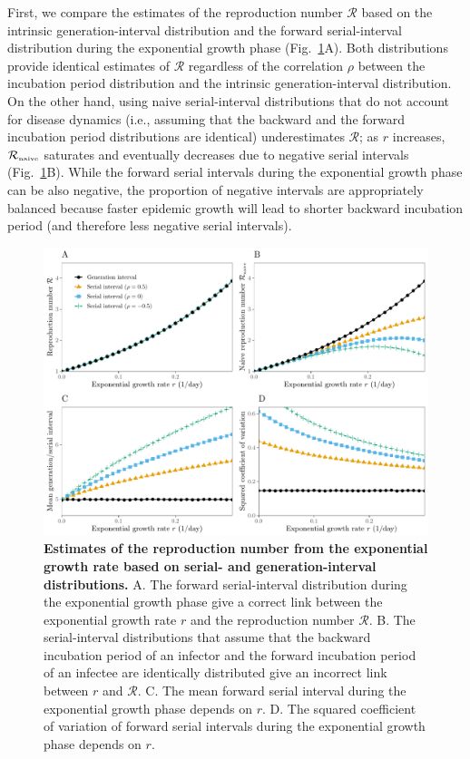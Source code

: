 \documentclass[12pt]{article}
\newcommand{\fref}[1]{Fig.~\ref{fig:#1}}
\begin{document}
First, we compare the estimates of the reproduction number $\mathcal R$ based on the intrinsic generation-interval distribution and the forward serial-interval distribution during the exponential growth phase (\fref{rR}A).
Both distributions provide identical estimates of $\mathcal R$ regardless of the correlation $\rho$ between the incubation period distribution and the intrinsic generation-interval distribution.
On the other hand, using naive serial-interval distributions that do not account for disease dynamics (i.e., assuming that the backward and the forward incubation period distributions are identical) underestimates $\mathcal R$;
as $r$ increases, ${\mathcal R}_{\textrm{\tiny naive}}$ saturates and eventually decreases due to negative serial intervals (\fref{rR}B).
While the forward serial intervals during the exponential growth phase can be also negative, the proportion of negative intervals are appropriately balanced because faster epidemic growth will lead to shorter backward incubation period (and therefore less negative serial intervals).

\begin{figure}[!th]
\includegraphics[width=\textwidth]{rR.pdf}
\caption{
\textbf{Estimates of the reproduction number from the exponential growth rate based on serial- and generation-interval distributions.}
A. The forward serial-interval distribution during the exponential growth phase give a correct link between the exponential growth rate $r$ and the reproduction number $\mathcal R$.
B. The serial-interval distributions that assume that the backward incubation period of an infector and the forward incubation period of an infectee are identically distributed give an incorrect link between $r$ and $\mathcal R$.
C. The mean forward serial interval during the exponential growth phase depends on $r$.
D. The squared coefficient of variation of forward serial intervals during the exponential growth phase depends on $r$.
}
\label{fig:rR}
\end{figure}
\end{document}
